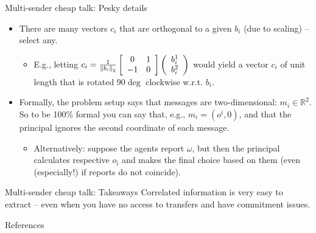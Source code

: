 \documentclass[english,10pt
,aspectratio=169
]{beamer}
\begin{document}
\begin{frame}{Multi-sender cheap talk: Pesky details}
	\begin{itemize}
		\item There are many vectors $c_i$ that are orthogonal to a given $b_i$ (due to scaling) -- select any.
		\begin{itemize}
			\item E.g., letting $c_i = \frac{1}{\left\| b_i \right\|_2 } \left[ \begin{array}{c c} 0 & 1 \\ -1 & 0 \end{array} \right] \left( \begin{array}{c}
				b_i^1 \\ b_i^2
			\end{array} \right)$ would yield a vector $c_i$ of unit length that is rotated $90\deg$ clockwise w.r.t. $b_i$.
		\end{itemize}
		\item Formally, the problem setup says that messages are two-dimensional: $m_i \in \mathbb{R}^2$. So to be 100\% formal you can say that, e.g., $m_i = (o^i, 0)$, and that the principal ignores the second coordinate of each message.
		\begin{itemize}
			\item Alternatively: suppose the agents report $\omega$, but then the principal calculates respective $o_i$ and makes the final choice based on them (even (especially!) if reports do not coincide).
		\end{itemize}
	\end{itemize}
\end{frame}


\begin{frame}{Multi-sender cheap talk: Takeaways}
	Correlated information is very easy to extract -- even when you have no access to transfers and have commitment issues.
\end{frame}



%


\appendix
\begin{frame}[allowframebreaks]{References}


\end{frame}
\end{document}

